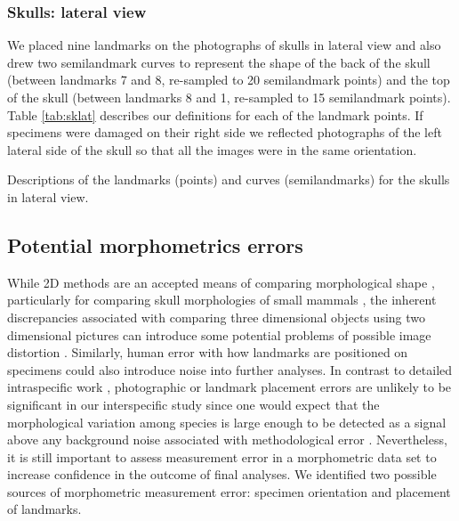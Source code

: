 \documentclass[12pt,a4paper]{article}
\begin{document}
\newpage
\subsubsection{Skulls: lateral view}
\vspace*{-0.5cm}
	We placed nine landmarks on the photographs of skulls in lateral view and also drew two semilandmark curves to represent the shape of the back of the skull (between landmarks 7 and 8, re-sampled to 20 semilandmark points) and the top of the skull (between landmarks 8 and 1, re-sampled to 15 semilandmark points). Table \ref{tab:sklat} describes our definitions for each of the landmark points.
	If specimens were damaged on their right side we reflected photographs of the left lateral side of the skull so that all the images were in the same orientation.

\begin{table}[!htb]
\caption[Skulls: lateral landmarks]
		{Descriptions of the landmarks (points) and curves (semilandmarks) for the skulls in lateral view.} 

\label{tab:sklat}
\end{table}
\subsection{{Potential morphometrics errors}}
\vspace*{-0.5cm}	 
	While 2D methods are an accepted means of comparing morphological shape \citep[e.g.][]{Adams2004, Mitteroecker2009}, particularly for comparing skull morphologies of small mammals \citep[e.g.][]{Cardini2003, Panchetti2008, White2008, Barrow2008, Scalici2011}, the inherent discrepancies associated with comparing three dimensional objects using two dimensional pictures can introduce some potential problems of possible image distortion \citep{Arnqvist1998}. Similarly, human error with how landmarks are positioned on specimens could also introduce noise into further analyses.
	In contrast to detailed intraspecific work \citep[e.g.][]{Bornholdt2008, Blagojevic2011}, photographic or landmark placement errors are unlikely to be significant in our interspecific study since one would expect that the morphological variation among species is large enough to  be detected as a signal above any background noise associated with methodological error \citep{Arnqvist1998}. Nevertheless, it is still important to assess measurement error in a morphometric data set to increase confidence in the outcome of final analyses.
	We identified two possible sources of morphometric measurement error: specimen orientation and placement of landmarks.
\end{document}
